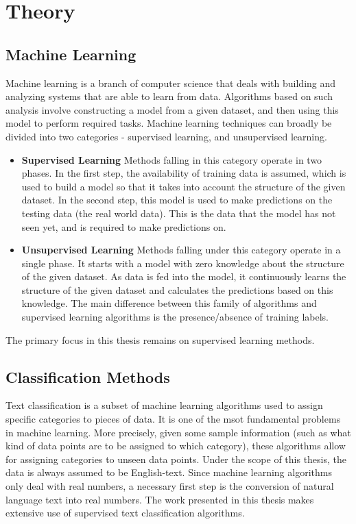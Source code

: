 \chapter{Theory}
\label{chapter:theory}

\section{Machine Learning}
Machine learning is a branch of computer science that deals with building and analyzing systems that are able to learn from data. Algorithms based on such analysis involve constructing a model from a given dataset, and then using this model to perform required tasks. Machine learning techniques can broadly be divided into two categories - supervised learning, and unsupervised learning.

\begin{itemize}
    \item{\textbf{Supervised Learning} Methods falling in this category operate in two phases. In the first step, the availability of training data is assumed, which is used to build a model so that it takes into account the structure of the given dataset. In the second step, this model is used to make predictions on the testing data (the real world data). This is the data that the model has not seen yet, and is required to make predictions on.}
    \item{\textbf{Unsupervised Learning} Methods falling under this category operate in a single phase. It starts with a model with zero knowledge about the structure of the given dataset. As data is fed into the model, it continuously learns the structure of the given dataset and calculates the predictions based on this knowledge. The main difference between this family of algorithms and supervised learning algorithms is the presence/absence of training labels.}
\end{itemize}

The primary focus in this thesis remains on supervised learning methods.\\

\section{Classification Methods}
Text classification is a subset of machine learning algorithms used to assign specific categories to pieces of data. It is one of the msot fundamental problems in machine learning. More precisely, given some sample information (such as what kind of data points are to be assigned to which category), these algorithms allow for assigning categories to unseen data points. Under the scope of this thesis, the data is always assumed to be English-text. Since machine learning algorithms only deal with real numbers, a necessary first step is the conversion of natural language text into real numbers. The work presented in this thesis makes extensive use of supervised text classification algorithms.\\


